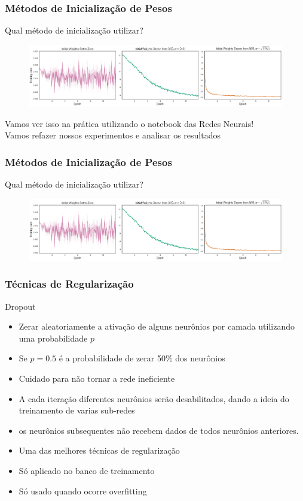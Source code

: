\documentclass{beamer}
\begin{document}
\begin{frame}
	\frametitle{Métodos de Inicialização de Pesos}
	\begin{block}{Qual método de inicialização utilizar?}
	\begin{figure}
		\centering
		\includegraphics[width=1\linewidth]{figures/weights_init}
	\end{figure}
	Vamos ver isso na prática utilizando o notebook das Redes Neurais! \\
	Vamos refazer nossos experimentos e analisar os resultados
	\end{block}
\end{frame}
\begin{frame}
	\frametitle{Métodos de Inicialização de Pesos}
	\begin{block}{Qual método de inicialização utilizar?}
		\begin{figure}
			\centering
			\includegraphics[width=1\linewidth]{figures/weights_init}
		\end{figure}
	\end{block}
\end{frame}
\begin{frame}
	\frametitle{Técnicas de Regularização}
	\begin{block}{Dropout}
		\begin{itemize}
			\item Zerar aleatoriamente a ativação de alguns neurônios por camada utilizando uma probabilidade $p$
			\item Se $p=0.5$ é a probabilidade de zerar 50\% dos neurônios
			\item Cuidado para não tornar a rede ineficiente
			\item A cada iteração diferentes neurônios serão desabilitados, dando a ideia do treinamento de varias sub-redes
			\item os neurônios subsequentes não recebem dados de todos neurônios anteriores.
			\item Uma das melhores técnicas de regularização
			\item Só aplicado no banco de treinamento
			\item Só usado quando ocorre overfitting
		\end{itemize}
	\end{block}
\end{frame}
\end{document}
